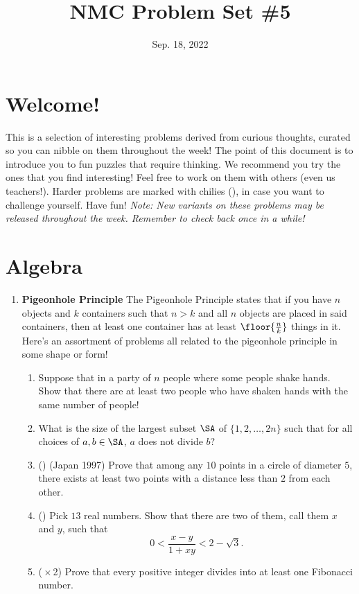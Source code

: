 \documentclass[11pt]{scrartcl}
\begin{document}
\title{NMC Problem Set \#5}
\date{Sep. 18, 2022} 
\maketitle

\section*{Welcome!}

This is a selection of interesting problems derived from curious thoughts, curated so you can nibble on them throughout the week! The point of this document is to introduce you to fun puzzles that require thinking. We recommend you try the ones that you find interesting! Feel free to work on them with others (even us teachers!). Harder problems are marked with chilies (\fullchili), in case you want to challenge yourself.
\newline\newline
Have fun! \textit{Note: New variants on these problems may be released throughout the week. Remember to check back once in a while!}
    
\section{Algebra}
\begin{enumerate}[label=\textbf{A\arabic*}.]
    \item \textbf{Pigeonhole Principle} \newline
    The Pigeonhole Principle states that if you have $n$ objects and $k$ containers such that $n>k$ and all $n$ objects are placed in said containers, then at least one container has at least $\floor{\frac{n}{k}}$ things in it. Here's an assortment of problems all related to the pigeonhole principle in some shape or form!
    \begin{enumerate}
        \item Suppose that in a party of $n$ people where some people shake hands. Show that there are at least two people who have shaken hands with the same number of people!
        
        \item What is the size of the largest subset $\SA$ of $\{1, 2, \dots, 2n\}$ such that for all choices of $a, b \in \SA$, $a$ does not divide $b$?
        
        \item (\halfchili) (Japan 1997) Prove that among any $10$ points in a circle of diameter $5$, there exists at least two points with a distance less than $2$ from each other.
        
        \item (\fullchili) Pick $13$ real numbers. Show that there are two of them, call them $x$ and $y$, such that
        \[ 0 < \frac{x - y}{1 + xy} < 2 - \sqrt{3}. \]
        
        \item (\fullchili\,$\times$\,2) Prove that every positive integer divides into at least one Fibonacci number.
    \end{enumerate}
\end{enumerate}
\end{document}
